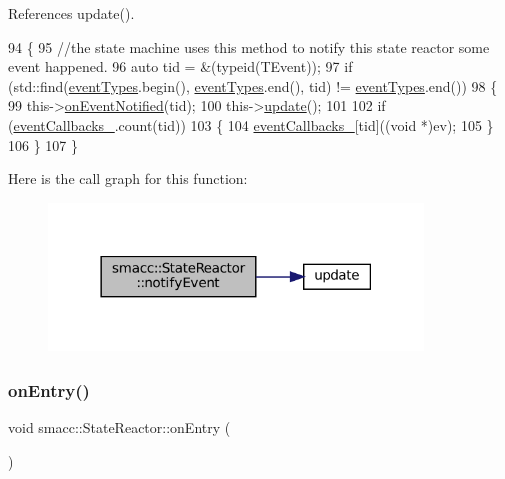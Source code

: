 References update().


\begin{DoxyCode}
94     \{
95         \textcolor{comment}{//the state machine uses this method to notify this state reactor some event happened.}
96         \textcolor{keyword}{auto} tid = &(\textcolor{keyword}{typeid}(TEvent));
97         \textcolor{keywordflow}{if} (std::find(\hyperlink{classsmacc_1_1StateReactor_a65c8ddfce40e7859e5c73fff1cf6c04b}{eventTypes}.begin(), \hyperlink{classsmacc_1_1StateReactor_a65c8ddfce40e7859e5c73fff1cf6c04b}{eventTypes}.end(), tid) != 
      \hyperlink{classsmacc_1_1StateReactor_a65c8ddfce40e7859e5c73fff1cf6c04b}{eventTypes}.end())
98         \{
99             this->\hyperlink{classsmacc_1_1StateReactor_a17646b3c68a6d80d1e4da8c14238ce36}{onEventNotified}(tid);
100             this->\hyperlink{classsmacc_1_1StateReactor_aca5d4f7af06532272db55943b7810a43}{update}();
101 
102             \textcolor{keywordflow}{if} (\hyperlink{classsmacc_1_1StateReactor_a63cce05c412f3699cc1b15af9aeaf8af}{eventCallbacks\_}.count(tid))
103             \{
104                 \hyperlink{classsmacc_1_1StateReactor_a63cce05c412f3699cc1b15af9aeaf8af}{eventCallbacks\_}[tid]((\textcolor{keywordtype}{void} *)ev);
105             \}
106         \}
107     \}
\end{DoxyCode}
Here is the call graph for this function\+:
\nopagebreak
\begin{figure}[H]
\begin{center}
\leavevmode
\includegraphics[width=282pt]{classsmacc_1_1StateReactor_a9e1b551ab97d1c18b2e1bb60a60455da_cgraph}
\end{center}
\end{figure}
\mbox{\label{classsmacc_1_1StateReactor_a11ed02721fd751b8272540645b88f4a6}} 
\subsubsection{\texorpdfstring{on\+Entry()}{onEntry()}}
{\footnotesize\ttfamily void smacc\+::\+State\+Reactor\+::on\+Entry (\begin{DoxyParamCaption}{ }\end{DoxyParamCaption})\hspace{0.3cm}{\ttfamily [virtual]}}



